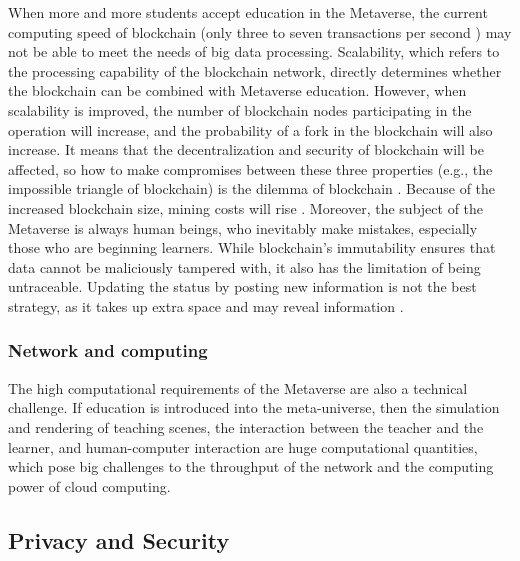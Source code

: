 \documentclass[conference]{IEEEtran}
\begin{document}
When more and more students accept education in the Metaverse, the current computing speed of blockchain (only three to seven transactions per second \cite{zheng2018blockchain}) may not be able to meet the needs of big data processing. Scalability, which refers to the processing capability of the blockchain network, directly determines whether the blockchain can be combined with Metaverse education. However, when scalability is improved, the number of blockchain nodes participating in the operation will increase, and the probability of a fork in the blockchain will also increase. It means that the decentralization and security of blockchain will be affected, so how to make compromises between these three properties (e.g., the impossible triangle of blockchain) is the dilemma of blockchain \cite{mohanta2019blockchain}. Because of the increased blockchain size, mining costs will rise \cite{park2021promises}. Moreover, the subject of the Metaverse is always human beings, who inevitably make mistakes, especially those who are beginning learners. While blockchain's immutability ensures that data cannot be maliciously tampered with, it also has the limitation of being untraceable. Updating the status by posting new information is not the best strategy, as it takes up extra space and may reveal information \cite{alammary2019blockchain}.

\subsubsection{Network and computing}

The high computational requirements of the Metaverse are also a technical challenge. If education is introduced into the meta-universe, then the simulation and rendering of teaching scenes, the interaction between the teacher and the learner, and human-computer interaction are huge computational quantities, which pose big challenges to the throughput of the network and the computing power of cloud computing.

\subsection{Privacy and Security} \label{subsec:privacy}
\end{document}
